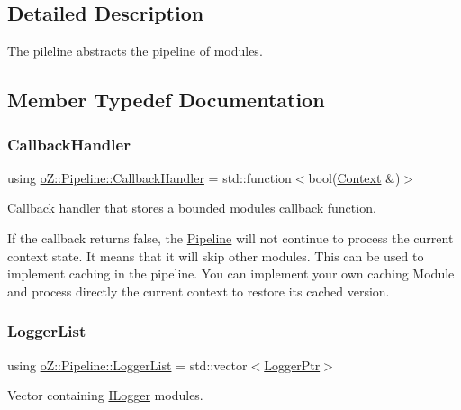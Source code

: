 \subsection{Detailed Description}
The pileline abstracts the pipeline of modules. 

\subsection{Member Typedef Documentation}
\mbox{\label{classo_z_1_1_pipeline_a5a71ea2f2d4be5b82589c1b8175722f4}} 
\subsubsection{\texorpdfstring{CallbackHandler}{CallbackHandler}}
{\footnotesize\ttfamily using \mbox{\hyperlink{classo_z_1_1_pipeline_a5a71ea2f2d4be5b82589c1b8175722f4}{o\+Z\+::\+Pipeline\+::\+Callback\+Handler}} =  std\+::function$<$bool(\mbox{\hyperlink{classo_z_1_1_context}{Context}} \&)$>$}



Callback handler that stores a bounded module\textquotesingle{}s callback function. 

If the callback returns false, the \mbox{\hyperlink{classo_z_1_1_pipeline}{Pipeline}} will not continue to process the current context state. It means that it will skip other modules. This can be used to implement caching in the pipeline. You can implement your own caching Module and process directly the current context to restore its cached version. \mbox{\label{classo_z_1_1_pipeline_aa1f26badb603f054e554e3ddf8b846b0}} 
\subsubsection{\texorpdfstring{LoggerList}{LoggerList}}
{\footnotesize\ttfamily using \mbox{\hyperlink{classo_z_1_1_pipeline_aa1f26badb603f054e554e3ddf8b846b0}{o\+Z\+::\+Pipeline\+::\+Logger\+List}} =  std\+::vector$<$\mbox{\hyperlink{namespaceo_z_aaa2fbabbfafc6616a7e69651b62a3d4e}{Logger\+Ptr}}$>$}



Vector containing \mbox{\hyperlink{classo_z_1_1_i_logger}{I\+Logger}} modules. 

